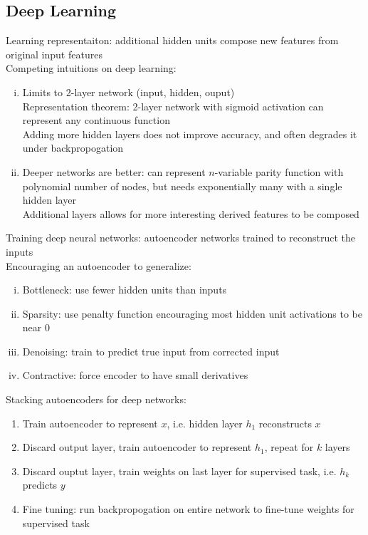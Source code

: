 \documentclass{article}
\begin{document}
		\subsection{Deep Learning}
			Learning representaiton: additional hidden units compose new features from original input features \\
			Competing intuitions on deep learning:
			\begin{enumerate}[(i)]
				\item Limits to 2-layer network (input, hidden, ouput) \\
				Representation theorem: 2-layer network with sigmoid activation can represent any continuous function \\
				Adding more hidden layers does not improve accuracy, and often degrades it under backpropogation
				\item Deeper networks are better: can represent $n$-variable parity function with polynomial number of nodes, but needs exponentially many with a single hidden layer \\
				Additional layers allows for more interesting derived features to be composed
				\end{enumerate}
			Training deep neural networks: autoencoder networks trained to reconstruct the inputs \\
			Encouraging an autoencoder to generalize:
			\begin{enumerate}[(i)]
				\item Bottleneck: use fewer hidden units than inputs
				\item Sparsity: use penalty function encouraging most hidden unit activations to be near 0
				\item Denoising: train to predict true input from corrected input
				\item Contractive: force encoder to have small derivatives
				\end{enumerate}
			Stacking autoencoders for deep networks:
			\begin{enumerate}
				\item Train autoencoder to represent $x$, i.e. hidden layer $h_1$ reconstructs $x$
				\item Discard output layer, train autoencoder to represent $h_1$, repeat for $k$ layers
				\item Discard ouptut layer, train weights on last layer for supervised task, i.e. $h_k$ predicts $y$
				\item Fine tuning: run backpropogation on entire network to fine-tune weights for supervised task
				\end{enumerate}
		\clearpage
\end{document}
